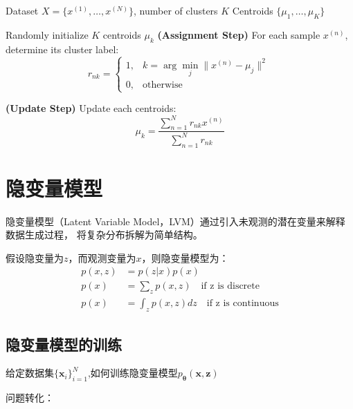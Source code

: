 \documentclass[withoutpreface,bwprint]{NoteBook}
\begin{document}
\begin{algorithm}
    \caption{K-Means Algorithm}
    \begin{algorithmic}[1]
        \REQUIRE Dataset $X = \{x^{(1)}, \ldots, x^{(N)}\}$, number of clusters $K$
        \ENSURE Centroids $\{\mu_1, \ldots, \mu_K\}$
        
        \STATE Randomly initialize $K$ centroids $\mu_k$
        \REPEAT
            \STATE \textbf{(Assignment Step)} For each sample $x^{(n)}$, determine its cluster label:
            \[
                r_{nk} =
                \begin{cases}
                    1, & k = \arg\min_j \| x^{(n)} - \mu_j \|^2 \\
                    0, & \text{otherwise}
                \end{cases}
            \]
            
            \STATE \textbf{(Update Step)} Update each centroids:
            \[
                \mu_k = \frac{\sum_{n=1}^N r_{nk} x^{(n)}}{\sum_{n=1}^N r_{nk}}
            \]
            
    \end{algorithmic}
\end{algorithm}


\section{隐变量模型}
隐变量模型（Latent Variable Model，LVM）通过引入未观测的潜在变量来解释数据生成过程，
将复杂分布拆解为简单结构。

假设隐变量为$z$，而观测变量为$x$，则隐变量模型为：
\begin{align}
    p(x,z) &= p(z|x)p(x) \\
    p(x) &= \sum_{z} p(x,z) \quad \text{if z is discrete}\\
    p(x) &= \int_{z} p(x,z) dz \quad \text{if z is continuous}
\end{align}

\subsection{隐变量模型的训练}
给定数据集$\{{\mathbf{x}_i}\}_{i=1}^N$,如何训练隐变量模型$p_{\mathbf{\theta}}({\mathbf{x},\mathbf{z}})$

问题转化：
\end{document}
